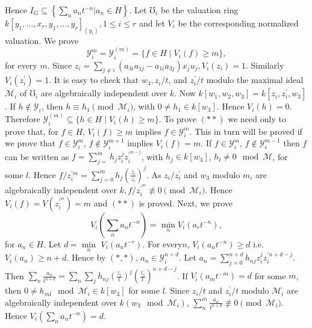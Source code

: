 Hence \quad $I_G  \subseteq \left\{ \sum\limits_n a_n t^{-n} \big| a_n
\in H \right\}$. Let $\mho_i$ be the valuation ring $k [y_1, \dots ,
  x_r,  y_1, \dots , y_r]_{(y_i)}, 1\le i \le r$ and let $V_i$ be the
corresponding normalized valuation. We prove
\begin{equation*}
 \mathscr{Y}_{i}^{m}= \mathscr{Y}_{i}^{(m)}= \bigg\{ f \in H \mid V_i
(f) \ge m \bigg\}, \tag*{$\ast\ast$}
\end{equation*}
for every $m$. Since $ z_i = \underset{j \ne i}
{\sum} (a_{3i} a_{1j} - a_{1i} a_{3j}) x_j u_j, V_i
(z_i)=1$. Similarly $V_i (z_{i}^{\prime})= 1$. It is easy to
check that $ w_3, z_i /t$, and $ z_{i}^{\prime}/t$ modulo the
maximal ideal $\mathscr{M}_i$ of $\mho_i$ are algebraically
independent over $k$. Now $k[w_1, w_2, w_3] = k [z_i,
 z_{i}^{\prime}, w_3]$. If $ h \notin \mathscr{Y}_i$, then $
h \equiv h_1 \pmod {\mathscr{M}_i}$, with $ 0\ne h_1 \in k [w_3]$. Hence $
V_i(h)=0$. Therefore $\mathscr{Y}_{i}^{(m)} \subseteq \bigg\{ h
\in H \mid V_i (h) \ge m \bigg\}$. To prove $(\ast\ast)$ we
need only to prove that, for $f \in H$, $V_i (f) \ge m$ implies
$ f \in \mathscr{Y}_{i}^{m}$. This in turn will be proved if we
prove that $f \in \mathscr{Y}_{i}^{m}$, $f \notin
\mathscr{Y}_{i}^{m+1}$ implies $ V_i (f)=m$. 
 If $ f\in \mathscr{Y}_{i}^{m}$, $f\notin \mathscr{Y}_{i}^{m-1}$ then $f$ can be
 written as $f = \sum\limits^m_{j=}h_j z_{i}^{j}
 z_{i}^{\prime^{m-j}}$, with $ h_j \in k[w_3]$, $h_l \ne 0 \mod
 \mathscr{M}$, for  some $l$. Hence $ f/z_{i}^{\prime m} = \sum\limits^m_{j=0} h_j
 (\frac{z_i}{z_i})^j$. As $z_i/z_{i}^{\prime}$ and $w_3$ modulo
 $m_i$ are algebraically independent over $k, f/z_{i}^{\prime^{m}}
 \not\equiv 0 \pmod {\mathscr{M}_i}$. Hence $V_i (f)=
 V(z_{i}^{\prime^{m}})=m$ and 
 $(\ast\ast)$ is proved. Next, we prove 
\begin{equation*}
V_i (\underset{n}{\sum}a_n t^{-n})= \underset{n}{\min} V_i (a_r
t^{-n}),
\end{equation*}
 for $a_n \in H$. Let $ d = \underset{n}{\min}$ $V_i (a_n t^{-r})
 $. For every\pageoriginale $n$, $V_i (a_n t^{-n})\ge d$ i.e. $V_i
 (a_n)\ge n+d$. Hence by $(\ast , \ast)$, $a_n \in
 \mathscr{Y}_{i}^{n+d}$. Let $a_n = \sum\limits^{n+d}_{j=0} h_{nj}
 z_{i}^{j} z_{i}^{\prime n+d-j}$. Then $\sum\limits_n
 \frac{a_n}{t^{n+d}} = \sum\limits_n 
 \sum\limits_j h_{nj} (\frac{z_i}{t})^j (\frac{z_{i}^{\prime}}
{t})^{n+d-j} $. If $V_i (a_m t^{-m}) = d$ for some $m$,
then $ 0 \ne h_{ml} \mod \mathscr{M}_i \in k[w_3] $ for
some $l$. Since $ z_i/t$ and $ z_{i}^{\prime}/t$ 
modulo $\mathscr{M}_i $ are algebraically independent
over $ k (w_3 \mod \mathscr{M}_i)$, $\sum\limits^m_n
\frac{a_n}{t^{n+d}} \not\equiv 0 \pmod {\mathscr{M}_i}$. Hence $V_i
(\sum\limits_n a_n t^{-n})=d $.  

